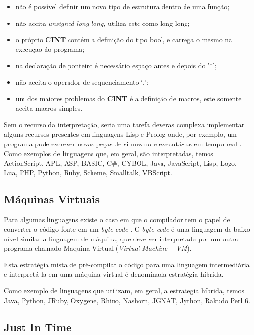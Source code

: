 \begin{itemize}
	\item não é possível definir um novo tipo de estrutura dentro de uma função;
    \item não aceita \textit{unsigned long long}, utiliza este como long long;
    \item o próprio \textbf{CINT} contém a definição do tipo bool, e carrega o mesmo na execução do programa;
    \item na declaração de ponteiro é necessário espaço antes e depois do '*'; 
    \item não aceita o operador de sequenciamento ‘,’; 
    \item um dos maiores problemas do \textbf{CINT} é a definição de macros, este somente aceita macros simples.
\end{itemize}

Sem  o recurso da interpretação, seria uma tarefa deveras complexa implementar 
alguns recursos  presentes em linguagens Lisp e Prolog onde, por exemplo, 
um programa pode escrever novas peças de si mesmo e executá-las em tempo real
 \cite[pág. 17]{ref6}.
Como exemplos de linguagens que, em geral, são interpretadas, temos ActionScript,
 APL, ASP, BASIC, C\#, CYBOL, Java, JavaScript, Lisp, Logo, Lua, PHP, Python, Ruby,
 Scheme, Smalltalk, VBScript.
 

\subsection{Máquinas Virtuais}

Para algumas linguagens existe o caso em que o compilador tem o papel
 de converter o código fonte em um \textit{byte code} \cite[pág. 49]{ref9}. 
O \textit{byte code}
é uma linguagem de baixo nível  similar a linguagem de máquina, que 
deve ser interpretada por um outro programa chamado Maquina Virtual (\textit{Virtual Machine -- VM}).

Esta estratégia mista de pré-compilar o código para uma linguagem 
intermediária e interpretá-la em uma máquina virtual é denominada 
estratégia híbrida. 

Como exemplo de linguagens que utilizam, em geral, a estrategia híbrida, temos 
 Java, Python, JRuby, Oxygene, Rhino, Nashorn, JGNAT, Jython, Rakudo Perl 6.

\subsection{Just In Time}

